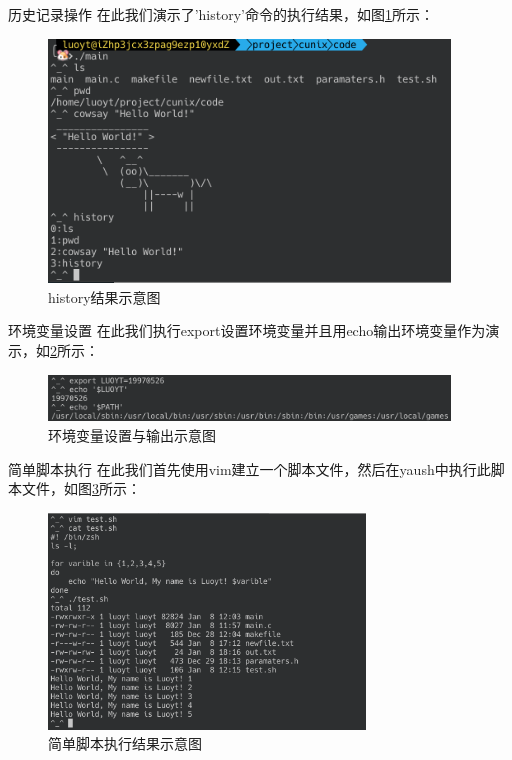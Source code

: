 \documentclass[10pt]{beamer}
\begin{document}
\begin{frame}{历史记录操作}
在此我们演示了'history'命令的执行结果，如图\ref{history}所示：
\begin{figure}[htbp]
	\centering
	\includegraphics[width=0.95\textwidth]{images/history}
	\caption{\label{history}history结果示意图}
\end{figure}
\end{frame}
\begin{frame}{环境变量设置}
在此我们执行export设置环境变量并且用echo输出环境变量作为演示，如\ref{envvar}所示：
\begin{figure}[htbp]
	\centering
	\includegraphics[width=0.95\textwidth]{images/envvar}
	\caption{\label{envvar}环境变量设置与输出示意图}
\end{figure}
\end{frame}
\begin{frame}{简单脚本执行}
在此我们首先使用vim建立一个脚本文件，然后在yaush中执行此脚本文件，如图\ref{script}所示：
\begin{figure}[htbp]
	\centering
	\includegraphics[width=0.75\textwidth]{images/script}
	\caption{\label{script}简单脚本执行结果示意图}
\end{figure}
\end{frame}
\end{document}
